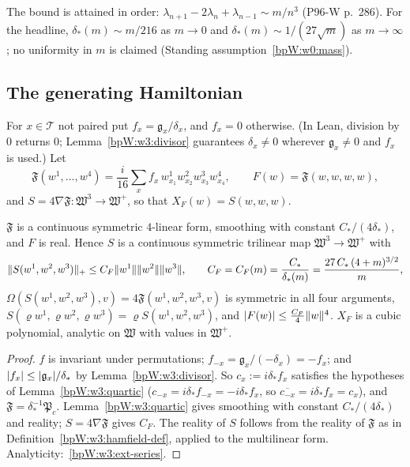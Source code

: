 \begin{remark}
The bound is attained in order: $\lambda_{n+1}-2\lambda_n+\lambda_{n-1}\sim m/n^3$ (P96-W p.~286). For the headline,
$\delta_*(m)\sim m/216$ as $m\to0$ and $\delta_*(m)\sim1/(27\sqrt m)$ as $m\to\infty$; no uniformity in $m$ is
claimed (Standing assumption~\ref{bpW:w0:mass}).
\end{remark}

\subsection{The generating Hamiltonian}\label{bpW:w3:F-sec}

\begin{definition}\label{bpW:w3:Fdef}
For $x\in\mathcal T$ not paired put $f_x=\mathfrak g_x/\delta_x$, and $f_x=0$ otherwise. (In Lean, division by $0$
returns $0$; Lemma~\ref{bpW:w3:divisor} guarantees $\delta_x\ne0$ wherever $\mathfrak g_x\ne0$ and $f_x$ is
used.) Let
\[\mathfrak F(w^1,\dots,w^4)=\frac{i}{16}\sum_xf_x\,w^1_{x_1}w^2_{x_2}w^3_{x_3}w^4_{x_4},\qquad F(w)=\mathfrak F(w,w,w,w),\]
and $S=4\nabla\mathfrak F:\mathfrak W^3\to\mathfrak W^+$, so that $X_F(w)=S(w,w,w)$.
\end{definition}

\begin{theorem}\label{bpW:w3:F}
$\mathfrak F$ is a continuous symmetric $4$-linear form, smoothing with constant $C_*/(4\delta_*)$, and $F$ is real.
Hence $S$ is a continuous symmetric trilinear map $\mathfrak W^3\to\mathfrak W^+$ with
\[\lVert S(w^1,w^2,w^3)\rVert_+\le C_F\lVert w^1\rVert\lVert w^2\rVert\lVert w^3\rVert,\qquad C_F=C_F(m)=\frac{C_*}{\delta_*(m)}=\frac{27\,C_*\,(4+m)^{3/2}}{m},\]
$\Omega(S(w^1,w^2,w^3),v)=4\mathfrak F(w^1,w^2,w^3,v)$ is symmetric in all four arguments,
$S(\varrho w^1,\varrho w^2,\varrho w^3)=\varrho S(w^1,w^2,w^3)$, and $\lvert F(w)\rvert\le\frac{C_F}4\lVert w\rVert^4$. $X_F$ is a
cubic polynomial, analytic on $\mathfrak W$ with values in $\mathfrak W^+$.
\end{theorem}

\begin{proof}
\label{stepW:w3:fcoef}
$f$ is invariant under permutations; $f_{-x}=\mathfrak g_x/(-\delta_x)=-f_x$; and $\lvert f_x\rvert\le\lvert \mathfrak g_x\rvert/\delta_*$
by Lemma~\ref{bpW:w3:divisor}. So $c_x:=i\delta_*f_x$ satisfies the hypotheses of Lemma~\ref{bpW:w3:quartic}
($c_{-x}=i\delta_*f_{-x}=-i\delta_*f_x$, so $\overline{c_{-x}}=i\delta_*f_x=c_x$), and $\mathfrak F=\delta_*^{-1}\mathfrak P_c$.
\label{stepW:w3:Fconcl}
Lemma~\ref{bpW:w3:quartic} gives smoothing with constant $C_*/(4\delta_*)$ and reality; $S=4\nabla\mathfrak F$
gives $C_F$. The reality of $S$ follows from the reality of $\mathfrak F$ as in
Definition~\ref{bpW:w3:hamfield-def}, applied to the multilinear form. Analyticity:~\ref{bpW:w3:ext-series}.
\end{proof}


